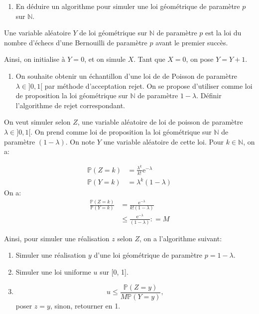 \documentclass[]{article}
\providecommand{\tightlist}{%
  \setlength{\itemsep}{0pt}\setlength{\parskip}{0pt}}
\newenvironment{Correction}%
  { \vspace{\baselineskip}\begin{mdframed}[backgroundcolor=my_green]}%
  {\end{mdframed}}
\begin{document}
\begin{enumerate}
\def\labelenumi{\arabic{enumi}.}
\setcounter{enumi}{1}
\tightlist
\item
  En déduire un algorithme pour simuler une loi géométrique de paramètre
  \(p\) sur \(\mathbb{N}\).
\end{enumerate}

\begin{Correction}

Une variable aléatoire $Y$ de loi géométrique sur $\mathbb{N}$  de paramètre $p$ est la loi du nombre d'échecs d'une Bernouilli de paramètre $p$ avant le premier succès.

Ainsi, on initialise à $Y = 0$, et on simule $X$. Tant que $X = 0$, on pose $Y = Y +1$.

\end{Correction}

\begin{enumerate}
\def\labelenumi{\arabic{enumi}.}
\setcounter{enumi}{2}
\tightlist
\item
  On souhaite obtenir un échantillon d'une loi de de Poisson de
  paramètre \(\lambda \in ]0, 1[\) par méthode d'acceptation rejet. On
  se propose d'utiliser comme loi de proposition la loi géométrique sur
  \(\mathbb{N}\) de paramètre \(1 - \lambda\). Définir l'algorithme de
  rejet correspondant.
\end{enumerate}

\begin{Correction}

On veut simuler selon $Z$, une variable aléatoire de loi de poisson  de paramètre $\lambda \in ]0, 1[$. On prend comme loi de proposition la loi géométrique sur $\mathbb{N}$ de paramètre $(1 - \lambda)$. On note $Y$ une variable aléatoire de cette loi.
Pour $k \in \mathbb{N}$, on a:

\begin{align*}
\mathbb{P}(Z = k) &= \frac{\lambda^k}{k!}\text{e}^{-\lambda}\\
\mathbb{P}(Y = k) &= \lambda^{k}(1 - \lambda)
\end{align*}
On a:
\begin{align*}
\frac{\mathbb{P}(Z = k)}{\mathbb{P}(Y = k)} &= \frac{\text{e}^{-\lambda}}{k! (1 - \lambda)}\\
&\leq \frac{\text{e}^{-\lambda}}{(1 - \lambda)} : = M
\end{align*}

Ainsi, pour simuler une réalisation $z$ selon $Z$, on a l'algorithme suivant:

\begin{enumerate}
\item Simuler une réalisation $y$ d'une loi géométrique  de paramètre $p = 1 - \lambda$.
\item Simuler une loi uniforme $u$ sur [0, 1].
\item $$u \leq \frac{\mathbb{P}(Z = y)}{M\mathbb{P}(Y = y)},$$ poser $z = y$, sinon, retourner en 1.
\end{enumerate}

\end{Correction}
\end{document}
